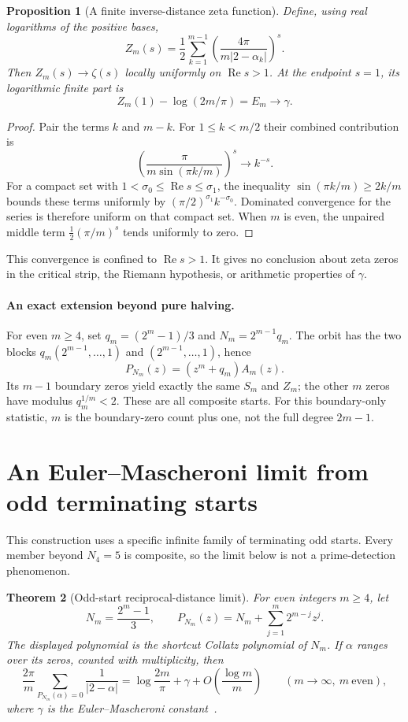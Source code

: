 \documentclass[11pt,a4paper]{article}
\newtheorem{theorem}{Theorem}[section]
\newtheorem{proposition}[theorem]{Proposition}
\theoremstyle{definition}
\theoremstyle{remark}
\numberwithin{equation}{section}
\begin{document}
\begin{proposition}[A finite inverse-distance zeta function]
Define, using real logarithms of the positive bases,
\[
 Z_m(s)=\frac12\sum_{k=1}^{m-1}
 \left(\frac{4\pi}{m|2-\alpha_k|}\right)^s.
\]
Then $Z_m(s)\to\zeta(s)$ locally uniformly on $\operatorname{Re}s>1$.
At the endpoint $s=1$, its logarithmic finite part is
\[
 Z_m(1)-\log(2m/\pi)=E_m\longrightarrow\gamma.
\]
\end{proposition}
\begin{proof}
Pair the terms $k$ and $m-k$. For $1\le k<m/2$ their combined
contribution is
\[
 \left(\frac{\pi}{m\sin(\pi k/m)}\right)^s\longrightarrow k^{-s}.
\]
For a compact set with $1<\sigma_0\le\operatorname{Re}s\le\sigma_1$,
the inequality $\sin(\pi k/m)\ge2k/m$ bounds these terms uniformly by
$(\pi/2)^{\sigma_1}k^{-\sigma_0}$. Dominated convergence for the
series is therefore uniform on that compact set. When $m$ is even,
the unpaired middle term $\frac12(\pi/m)^s$ tends uniformly to zero.
\end{proof}

This convergence is confined to $\operatorname{Re}s>1$. It gives no
conclusion about zeta zeros in the critical strip, the Riemann hypothesis,
or arithmetic properties of $\gamma$.

\paragraph{An exact extension beyond pure halving.}
For even $m\ge4$, set $q_m=(2^m-1)/3$ and $N_m=2^{m-1}q_m$.
The orbit has the two blocks
$q_m(2^{m-1},\ldots,1)$ and $(2^{m-1},\ldots,1)$, hence
\[
 P_{N_m}(z)=(z^m+q_m)A_m(z).
\]
Its $m-1$ boundary zeros yield exactly the same $S_m$ and $Z_m$;
the other $m$ zeros have modulus $q_m^{1/m}<2$.
These are all composite starts. For this boundary-only statistic,
$m$ is the boundary-zero count plus one, not the full degree $2m-1$.
\section{An Euler--Mascheroni limit from odd terminating starts}
\label{C:sec:gamma-odd}

This construction uses a specific infinite family of terminating odd starts.
Every member beyond $N_4=5$ is composite, so the limit below is not a
prime-detection phenomenon.

\begin{theorem}[Odd-start reciprocal-distance limit]
\label{C:thm:gamma-odd}
For even integers $m\ge4$, let
\[
 N_m=\frac{2^m-1}{3},\qquad
 P_{N_m}(z)=N_m+\sum_{j=1}^{m}2^{m-j}z^j.
\]
The displayed polynomial is the shortcut Collatz polynomial of $N_m$.
If $\alpha$ ranges over its zeros, counted with multiplicity, then
\[
 \frac{2\pi}{m}\sum_{P_{N_m}(\alpha)=0}\frac1{|2-\alpha|}
 =\log\frac{2m}{\pi}+\gamma
   +O\!\left(\frac{\log m}{m}\right)
 \qquad(m\longrightarrow\infty,\ m\ \text{even}),
\]
where $\gamma$ is the Euler--Mascheroni constant~\cite{R070}.
\end{theorem}
\end{document}
